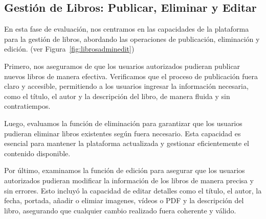 \documentclass[a4paper, 12pt]{book}
\begin{document}
\subsection{Gestión de Libros: Publicar, Eliminar y Editar}
\label{sec:publish-delete-edit-books}

En esta fase de evaluación, nos centramos en las capacidades de la plataforma para la gestión de libros, abordando las operaciones de publicación, 
eliminación y edición. (ver Figura~\ref{fig:librosadminedit})

Primero, nos aseguramos de que los usuarios autorizados pudieran publicar nuevos libros de manera efectiva. Verificamos que el proceso de publicación 
fuera claro y accesible, permitiendo a los usuarios ingresar la información necesaria, como el título, el autor y la descripción del libro, de manera 
fluida y sin contratiempos.

Luego, evaluamos la función de eliminación para garantizar que los usuarios pudieran eliminar libros existentes según fuera necesario. Esta capacidad es 
esencial para mantener la plataforma actualizada y gestionar eficientemente el contenido disponible.

Por último, examinamos la función de edición para asegurar que los usuarios autorizados pudieran modificar la información de los libros de manera precisa 
y sin errores. Esto incluyó la capacidad de editar detalles como el título, el autor, la fecha, portada, añadir o elimiar imagenes, vídeos o PDF y la descripción 
del libro, asegurando que cualquier cambio realizado fuera coherente y válido.
\end{document}
